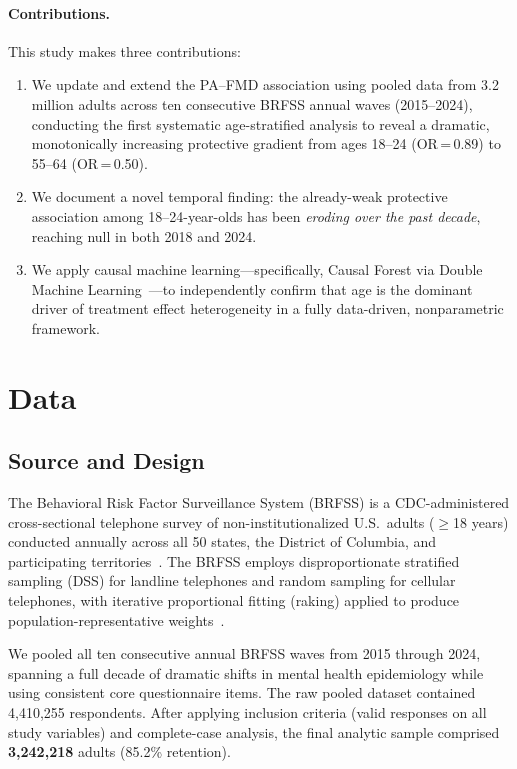 \documentclass[11pt]{article}
\begin{document}
\paragraph{Contributions.}
This study makes three contributions:
\begin{enumerate}
  \item We update and extend the PA--FMD association using pooled data from 3.2 million adults across ten consecutive BRFSS annual waves (2015--2024), conducting the first systematic age-stratified analysis to reveal a dramatic, monotonically increasing protective gradient from ages 18--24 (OR\,=\,0.89) to 55--64 (OR\,=\,0.50).
  \item We document a novel temporal finding: the already-weak protective association among 18--24-year-olds has been \emph{eroding over the past decade}, reaching null in both 2018 and 2024.
  \item We apply causal machine learning---specifically, Causal Forest via Double Machine Learning~\citep{wager2018estimation,chernozhukov2018double}---to independently confirm that age is the dominant driver of treatment effect heterogeneity in a fully data-driven, nonparametric framework.
\end{enumerate}

\section{Data}
\label{sec:data}

\subsection{Source and Design}

The Behavioral Risk Factor Surveillance System (BRFSS) is a CDC-administered cross-sectional telephone survey of non-institutionalized U.S.\ adults ($\geq$18 years) conducted annually across all 50 states, the District of Columbia, and participating territories~\citep{cdc_brfss_2024}.
The BRFSS employs disproportionate stratified sampling (DSS) for landline telephones and random sampling for cellular telephones, with iterative proportional fitting (raking) applied to produce population-representative weights~\citep{pierannunzi2013systematic}.

We pooled all ten consecutive annual BRFSS waves from 2015 through 2024, spanning a full decade of dramatic shifts in mental health epidemiology while using consistent core questionnaire items.
The raw pooled dataset contained 4,410,255 respondents.
After applying inclusion criteria (valid responses on all study variables) and complete-case analysis, the final analytic sample comprised \textbf{3,242,218} adults (85.2\% retention).
\end{document}
